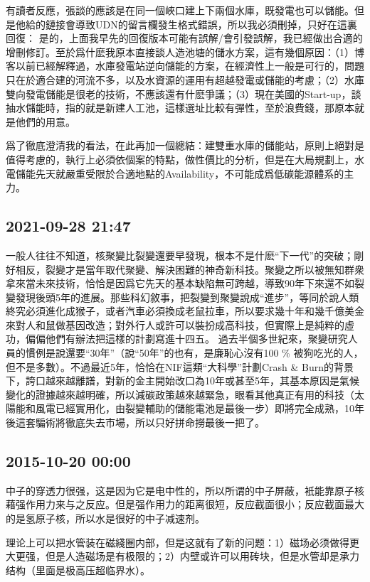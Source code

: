 \documentclass[twocolumn]{ctexart}
\begin{document}
有讀者反應，張談的應該是在同一個峽口建上下兩個水庫，既發電也可以儲能。但是他給的鏈接會導致UDN的留言欄發生格式錯誤，所以我必須刪掉，只好在這裏回復：
是的，上面我早先的回復版本可能有誤解/會引發誤解，我已經做出合適的增刪修訂。至於爲什麽我原本直接談人造池塘的儲水方案，這有幾個原因：（1）博客以前已經解釋過，水庫發電站逆向儲能的方案，在經濟性上一般是可行的，問題只在於適合建的河流不多，以及水資源的運用有超越發電或儲能的考慮；（2）水庫雙向發電儲能是很老的技術，不應該還有什麽爭議；（3）現在美國的Start-up，談抽水儲能時，指的就是新建人工池，這樣選址比較有彈性，至於浪費錢，那原本就是他們的用意。

爲了徹底澄清我的看法，在此再加一個總結：建雙重水庫的儲能站，原則上絕對是值得考慮的，執行上必須依個案的特點，做性價比的分析，但是在大局規劃上，水電儲能先天就嚴重受限於合適地點的Availability，不可能成爲低碳能源體系的主力。
\subsection*{2021-09-28 21:47}

一般人往往不知道，核聚變比裂變還要早發現，根本不是什麽“下一代”的突破；剛好相反，裂變才是當年取代聚變、解決困難的神奇新科技。聚變之所以被無知群衆拿來當未來技術，恰恰是因爲它先天的基本缺陷無可跨越，導致90年下來還不如裂變發現後頭5年的進展。那些科幻敘事，把裂變到聚變說成“進步”，等同於說人類終究必須進化成猴子，或者汽車必須換成老鼠拉車，所以要求幾十年和幾千億美金來對人和鼠做基因改造；對外行人或許可以裝扮成高科技，但實際上是純粹的虛功，偏偏他們有辦法把這樣的計劃寫進十四五。
過去半個多世紀來，聚變研究人員的慣例是說還要“30年”（說“50年”的也有，是廉恥心沒有100 \% 被狗吃光的人，但不是多數）。不過最近5年，恰恰在NIF這類“大科學”計劃Crash \& Burn的背景下，誇口越來越離譜，對新的金主開始改口為10年或甚至5年，其基本原因是氣候變化的證據越來越明確，所以減碳政策越來越緊急，眼看其他真正有用的科技（太陽能和風電已經實用化，由裂變輔助的儲能電池是最後一步）即將完全成熟，10年後這套騙術將徹底失去市場，所以只好拼命撈最後一把了。
\subsection*{2015-10-20 00:00}
中子的穿透力很强，这是因为它是电中性的，所以所谓的中子屏蔽，衹能靠原子核藉强作用力来与之反应。但是强作用力的距离很短，反应截面很小；反应截面最大的是氢原子核，所以水是很好的中子减速剂。

理论上可以把水管装在磁綫圈内部，但是这就有了新的问题：1）磁场必须做得更大更强，但是人造磁场是有极限的；2）内壁或许可以用砖块，但是水管却是承力结构（里面是极高压超临界水）。
\end{document}
